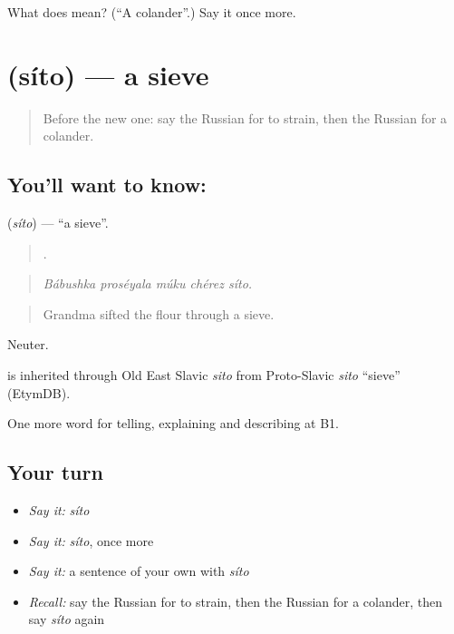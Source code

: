 \begin{tcolorbox}[breakable,colback=teal!4,colframe=teal!35!black,title={Before you move on}]
What does  mean? (\textquotedblleft{}A colander\textquotedblright{}.) Say it once more.
\end{tcolorbox}
\section[\texorpdfstring{\ru{сито} (síto)}{сито (síto)}]{ (síto) — a sieve}

\label{lesson:RU-C334-sito}



\begin{quote}
Before the new one: say the Russian for to strain, then the Russian for a colander.
\end{quote}

\subsection*{You'll want to know: }
\textbf{} (\emph{síto}) — \textquotedblleft{}a sieve\textquotedblright{}.

\begin{quote}
    .
\end{quote}

\begin{quote}
\emph{Bábushka proséyala múku chérez síto.}
\end{quote}

\begin{quote}
Grandma sifted the flour through a sieve.
\end{quote}

Neuter.

\begin{cousinweb}
\emph{} is inherited through Old East Slavic \emph{sito} from Proto-Slavic \emph{sito} \textquotedblleft{}sieve\textquotedblright{} (EtymDB).
\end{cousinweb}

\begin{grammarlens}[title={What you've built}]
One more word for telling, explaining and describing at B1.
\end{grammarlens}

\subsection*{Your turn}
\begin{itemize}
\raggedright
  \item \emph{Say it:} \emph{síto}
  \item \emph{Say it:} \emph{síto}, once more
  \item \emph{Say it:} a sentence of your own with \emph{síto}
  \item \emph{Recall:} say the Russian for to strain, then the Russian for a colander, then say \emph{síto} again
\end{itemize}

